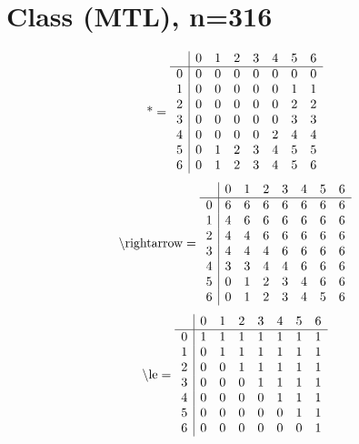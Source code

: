\documentclass[11pt]{article}
\begin{document}
\section{Class (MTL), n=316}
\[\text{*} = 
\begin{array}{r | r r r r r r r}
 & 0 & 1 & 2 & 3 & 4 & 5 & 6 \\ \hline
0 & 0 & 0 & 0 & 0 & 0 & 0 & 0 \\
1 & 0 & 0 & 0 & 0 & 0 & 1 & 1 \\
2 & 0 & 0 & 0 & 0 & 0 & 2 & 2 \\
3 & 0 & 0 & 0 & 0 & 0 & 3 & 3 \\
4 & 0 & 0 & 0 & 0 & 2 & 4 & 4 \\
5 & 0 & 1 & 2 & 3 & 4 & 5 & 5 \\
6 & 0 & 1 & 2 & 3 & 4 & 5 & 6 \\
\end{array}
\]
\[\text{\textbackslash rightarrow} = 
\begin{array}{r | r r r r r r r}
 & 0 & 1 & 2 & 3 & 4 & 5 & 6 \\ \hline
0 & 6 & 6 & 6 & 6 & 6 & 6 & 6 \\
1 & 4 & 6 & 6 & 6 & 6 & 6 & 6 \\
2 & 4 & 4 & 6 & 6 & 6 & 6 & 6 \\
3 & 4 & 4 & 4 & 6 & 6 & 6 & 6 \\
4 & 3 & 3 & 4 & 4 & 6 & 6 & 6 \\
5 & 0 & 1 & 2 & 3 & 4 & 6 & 6 \\
6 & 0 & 1 & 2 & 3 & 4 & 5 & 6 \\
\end{array}
\]
\[\text{\textbackslash le} = 
\begin{array}{r | r r r r r r r}
 & 0 & 1 & 2 & 3 & 4 & 5 & 6 \\ \hline
0 & 1 & 1 & 1 & 1 & 1 & 1 & 1 \\
1 & 0 & 1 & 1 & 1 & 1 & 1 & 1 \\
2 & 0 & 0 & 1 & 1 & 1 & 1 & 1 \\
3 & 0 & 0 & 0 & 1 & 1 & 1 & 1 \\
4 & 0 & 0 & 0 & 0 & 1 & 1 & 1 \\
5 & 0 & 0 & 0 & 0 & 0 & 1 & 1 \\
6 & 0 & 0 & 0 & 0 & 0 & 0 & 1 \\
\end{array}
\]
\end{document}
